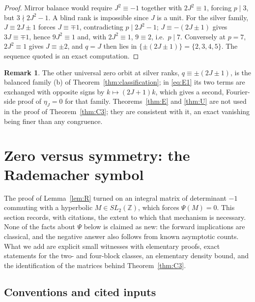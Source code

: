 \documentclass[11pt]{article}
\theoremstyle{definition}
\newtheorem{remark}[theorem]{Remark}
\newcommand{\Z}{\mathbb Z}
\begin{document}
\begin{proof}
Mirror balance would require $J^2\equiv-1$ together with $2J^2\equiv1$,
forcing $p\mid3$, but $3\nmid2J^2-1$.  A blind rank is impossible since
$J$ is a unit.  For the silver family, $J\equiv2J\pm1$ forces $J\equiv\mp1$,
contradicting $p\mid2J^2-1$; $J\equiv-(2J\pm1)$ gives $3J\equiv\mp1$,
hence $9J^2\equiv1$ and, with $2J^2\equiv1$, $9\equiv2$, i.e.\ $p\mid7$.
Conversely at $p=7$, $2J^2\equiv1$ gives $J\equiv\pm2$, and
$q=J$ then lies in $\{\pm(2J\pm1)\}=\{2,3,4,5\}$.  The sequence quoted is
an exact computation.
\end{proof}

\begin{remark}
The other universal zero orbit at silver ranks, $q\equiv\pm(2J\pm1)$, is
the balanced family (b) of Theorem~\ref{thm:classification}; in
\eqref{eq:E1} its two terms are exchanged with opposite signs by
$k\mapsto(2J+1)k$, which gives a second, Fourier-side proof of
$\eta_J=0$ for that family.  Theorems~\ref{thm:E} and \ref{thm:U} are
not used in the proof of Theorem~\ref{thm:C3}; they are consistent with
it, an exact vanishing being finer than any congruence.
\end{remark}

\section{Zero versus symmetry: the Rademacher symbol}
\label{sec:rademacher}

The proof of Lemma~\ref{lem:R} turned on an integral matrix of
determinant $-1$ commuting with a hyperbolic $M\in SL_2(\Z)$, which forces
$\Psi(M)=0$.  This section records, with citations, the extent to which
that mechanism is necessary.  None of the facts about $\Psi$ below is
claimed as new: the forward implications are classical, and the negative
answer also follows from known asymptotic counts.  What we add are
explicit small witnesses with elementary proofs, exact statements for the
two- and four-block classes, an elementary density bound, and the
identification of the matrices behind Theorem~\ref{thm:C3}.

\subsection{Conventions and cited inputs}
\end{document}
